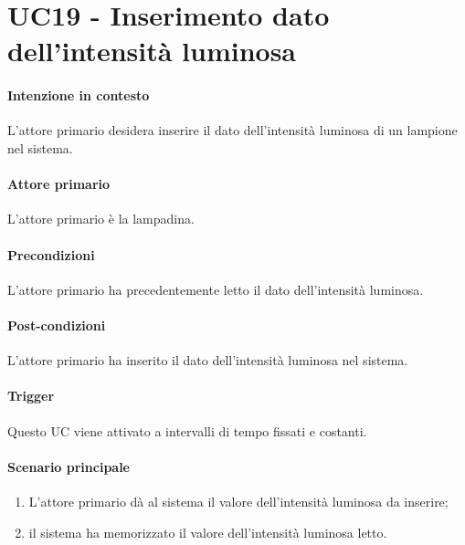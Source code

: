 \section{UC19 - Inserimento dato dell'intensità luminosa}\label{uc:19}
\paragraph{Intenzione in contesto} L'attore primario desidera inserire il dato dell'intensità luminosa di un lampione nel sistema.
\paragraph{Attore primario} L'attore primario è la lampadina.
\paragraph{Precondizioni} L'attore primario ha precedentemente letto il dato dell'intensità luminosa.
\paragraph{Post-condizioni} L'attore primario ha inserito il dato dell'intensità luminosa nel sistema.
\paragraph{Trigger} Questo UC viene attivato a intervalli di tempo fissati e costanti.
\paragraph{Scenario principale}
\begin{enumerate}
    \item L'attore primario dà al sistema il valore dell'intensità luminosa da inserire;
    \item il sistema ha memorizzato il valore dell'intensità luminosa letto.
\end{enumerate}